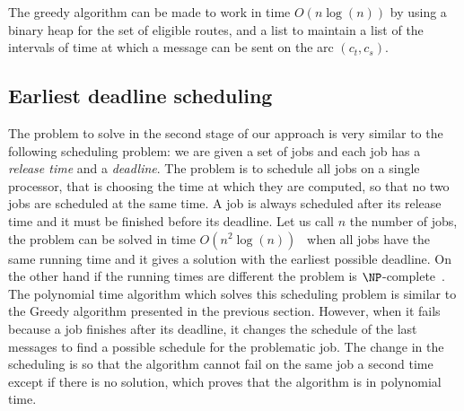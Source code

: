 \documentclass[10pt, conference, letterpaper]{IEEEtran}
\begin{document}
    The greedy algorithm can be made to work in time $O(n\log(n))$ by using a binary heap for the set of eligible routes, and a list to maintain a list of the intervals
    of time at which a message can be sent on the arc $(c_t,c_s)$.
%    
%     
    

    
     
     \subsection{Earliest deadline scheduling}
     
     
     The problem to solve in the second stage of our approach is very similar to the following scheduling problem: 
     we are given a set of jobs and each job has a \emph{release time} and a \emph{deadline}. 
     The problem is to schedule all jobs on a single processor, that is choosing the time at which they are computed, so that no two jobs are scheduled at the same time. A job is always scheduled after its release time and it must be finished before its deadline. Let us call $n$ the number of jobs, the problem can be solved in time $O(n^2\log(n))$~\cite{simons1978fast} when all jobs have the same running time and it gives a solution with the earliest possible deadline. On the other hand if the running times are different the problem is $\NP$-complete~\cite{lenstra1977complexity}. 
     The  polynomial time algorithm  which solves this scheduling problem is similar to the Greedy algorithm presented in the previous section. However, when it fails because a job finishes after its deadline, it changes the schedule of the last messages to find a possible schedule for the problematic job. The change in the scheduling is so that the algorithm cannot fail on the same job a second time except if there is no solution, which proves that the algorithm is in polynomial time.
     
\end{document}
